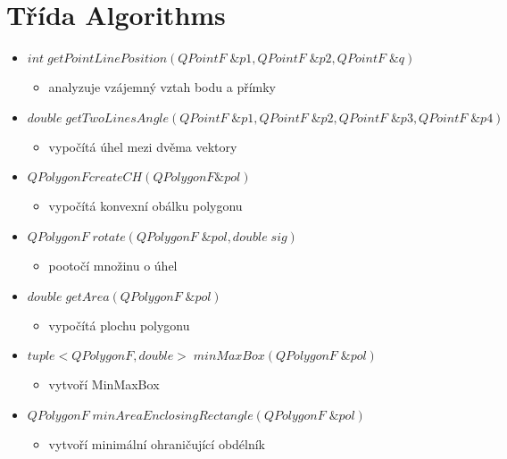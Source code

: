 \documentclass[oneside,12pt,a4paper]{book}
\begin{document}
\section{Třída Algorithms}
    \begin{itemize}
    \item $int \;getPointLinePosition(QPointF \; \&p1, QPointF \;\&p2, QPointF \;\&q)$
    \begin{itemize}
    \item analyzuje vzájemný vztah bodu a přímky
    \end{itemize}

    \item $double\; getTwoLinesAngle(QPointF \; \&p1,QPointF \; \&p2,QPointF \; \&p3,QPointF \; \&p4)$
        \begin{itemize}
    \item vypočítá úhel mezi dvěma vektory
    \end{itemize}
    
    \item $QPolygonF createCH(QPolygonF \&pol)$
        \begin{itemize}
    \item vypočítá konvexní obálku polygonu
    \end{itemize}

    \item $QPolygonF\; rotate(QPolygonF\; \&pol, double\; sig)$
    \begin{itemize}
    \item pootočí množinu o úhel
    \end{itemize}
    
    \item $double\; getArea(QPolygonF\; \&pol)$
    \begin{itemize}
    \item vypočítá plochu polygonu
    \end{itemize}
    
    \item $tuple<QPolygonF, double>\; minMaxBox(QPolygonF\; \&pol)$
    \begin{itemize}
    \item vytvoří MinMaxBox
    \end{itemize}
    
    \item $QPolygonF\; minAreaEnclosingRectangle(QPolygonF\; \&pol)$
    \begin{itemize}
    \item vytvoří minimální ohraničující obdélník
    \end{itemize}
    

\end{itemize}
\end{document}
